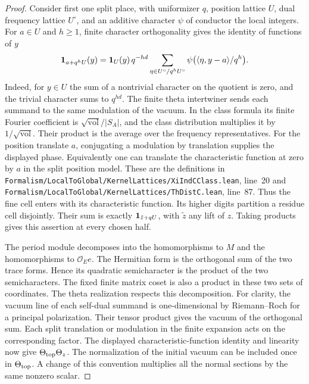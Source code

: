 \documentclass[a4paper,11pt]{article}
\theoremstyle{definition}
\theoremstyle{remark}
\newcommand{\srcloc}[2]{{\small\nolinkurl{#1.lean}}, line~#2}
\numberwithin{equation}{section}
\begin{document}
\begin{proof}
Consider first one split place, with uniformizer \(q\), position
lattice \(U\), dual frequency lattice \(U^\circ\), and an additive
character \(\psi\) of conductor the local integers. For \(a\in U\)
and \(h\ge1\), finite character orthogonality gives the identity
of functions of \(y\)
\[
 {\bf1}_{a+q^hU}(y)
  ={\bf1}_{U}(y)\,q^{-hd}
     \sum_{\eta\in U^\circ/q^hU^\circ}
       \psi\bigl(\langle\eta,y-a\rangle/q^h\bigr).
\]
Indeed, for \(y\in U\) the sum of a nontrivial character on the
quotient is zero, and the trivial character sums to \(q^{hd}\).
The finite theta intertwiner sends each summand to the same
modulation of the vacuum. In the class formula its finite Fourier
coefficient is \(\sqrt{\mathrm{vol}}/|S_A|\), and the class
distribution multiplies it by \(1/\sqrt{\mathrm{vol}}\). Their
product is the average over the frequency representatives.
For the position translate \(a\), conjugating a modulation by
translation supplies the displayed phase. Equivalently one can
translate the characteristic function at zero by \(a\) in the
split position model. These are the definitions in
\srcloc{Formalism/LocalToGlobal/KernelLattices/XiIndCClass}{20}
and \srcloc{Formalism/LocalToGlobal/KernelLattices/ThDistC}{87}.
Thus the fine cell enters with its characteristic function.
Its higher digits partition a residue cell disjointly. Their sum
is exactly \({\bf1}_{\tilde z+qU}\), with \(\tilde z\) any lift of \(z\).
Taking products gives this assertion at every chosen half.

The period module decomposes into the homomorphisms to \(M\) and
the homomorphisms to \(\mathcal O_Ee\). The Hermitian form is the
orthogonal sum of the two trace forms. Hence its quadratic
semicharacter is the product of the two semicharacters. The fixed
finite matrix coset is also a product in these two sets of
coordinates. The theta realization respects this decomposition.
For clarity, the vacuum line of each self-dual summand is
one-dimensional by Riemann--Roch for a principal polarization.
Their tensor product gives the vacuum of the orthogonal sum.
Each split translation or modulation in the finite expansion acts
on the corresponding factor. The displayed characteristic-function
identity and linearity now give \(\Theta_{\rm top}\Theta_z\).
The normalization of the initial vacuum can be included once in
\(\Theta_{\rm top}\). A change of this convention multiplies all
the normal sections by the same nonzero scalar.


\end{proof}
\end{document}
